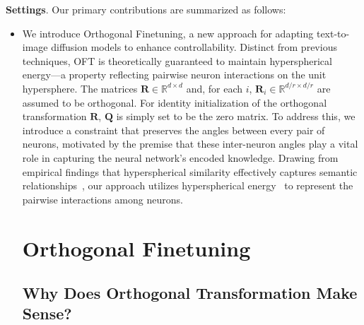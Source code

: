 \textbf{Settings}. Our primary contributions are summarized as follows:

\begin{itemize}[leftmargin=*,nosep]

    \item We introduce Orthogonal Finetuning, a new approach for adapting text-to-image diffusion models to enhance controllability. Distinct from previous techniques, OFT is theoretically guaranteed to maintain hyperspherical energy—a property reflecting pairwise neuron interactions on the unit hypersphere. The matrices $\bm{R}\in\mathbb{R}^{d\times d}$ and, for each $i$, $\bm{R}_i\in\mathbb{R}^{d/r\times d/r}$ are assumed to be orthogonal. For identity initialization of the orthogonal transformation $\bm{R}$, $\bm{Q}$ is simply set to be the zero matrix. To address this, we introduce a constraint that preserves the angles between every pair of neurons, motivated by the premise that these inter-neuron angles play a vital role in capturing the neural network’s encoded knowledge. Drawing from empirical findings that hyperspherical similarity effectively captures semantic relationships~\cite{liu2017deep,liu2018decoupled,chen2020angular}, our approach utilizes hyperspherical energy~\cite{liu2018learning} to represent the pairwise interactions among neurons. \section{Orthogonal Finetuning}

\subsection{Why Does Orthogonal Transformation Make Sense?}


\end{itemize}
